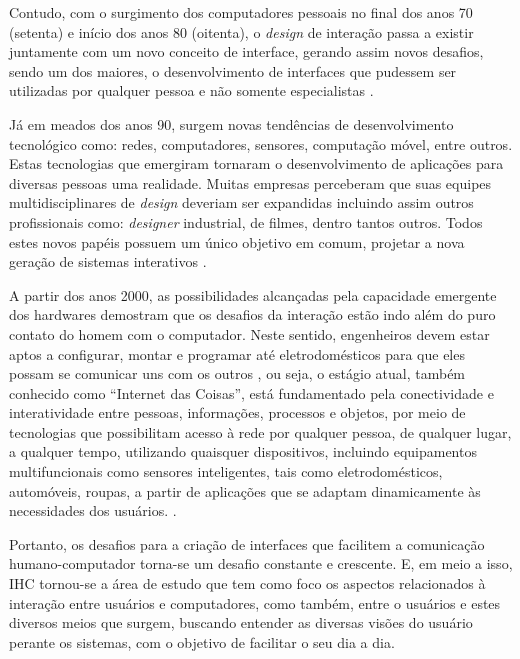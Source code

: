 Contudo, com o surgimento dos computadores pessoais no final dos anos 70 (setenta) e início dos anos 80 (oitenta), o \textit{design} de interação passa a existir juntamente com um novo conceito de interface, gerando assim novos desafios, sendo um dos maiores, o desenvolvimento de interfaces que pudessem ser utilizadas por qualquer pessoa e não somente especialistas \cite{rogers2005design}. 

Já em meados dos anos 90, surgem novas tendências de desenvolvimento tecnológico como: redes, computadores, sensores, computação móvel, entre outros. Estas tecnologias que emergiram tornaram o desenvolvimento de aplicações para diversas pessoas uma realidade. Muitas empresas perceberam que suas equipes multidisciplinares de \textit{design} deveriam ser expandidas incluindo assim outros profissionais como: \textit{designer} industrial, de filmes, dentro tantos outros. Todos estes novos papéis possuem um único objetivo em comum, projetar a nova geração de sistemas interativos \cite{rogers2013design}. 

A partir dos anos 2000, as possibilidades alcançadas pela capacidade emergente dos hardwares demostram que os desafios da interação estão indo além do puro contato do homem com o computador. Neste sentido, engenheiros devem estar aptos a configurar, montar e programar até eletrodomésticos para que eles possam se comunicar uns com os outros \cite{rogers2013design}, ou seja, o estágio atual, também conhecido como ``Internet das Coisas'', está fundamentado pela conectividade e interatividade entre pessoas, informações, processos e objetos, por meio de tecnologias que possibilitam acesso à rede por qualquer pessoa, de qualquer lugar, a qualquer tempo, utilizando quaisquer dispositivos, incluindo equipamentos multifuncionais como sensores inteligentes, tais como eletrodomésticos, automóveis, roupas, a partir de aplicações que se adaptam dinamicamente às necessidades dos usuários. \cite{lacerda2015necessidade}. 

Portanto, os desafios para a criação de interfaces que facilitem a comunicação humano-computador torna-se um desafio constante e crescente. E, em meio a isso, IHC tornou-se a área de estudo que tem como foco os aspectos relacionados à interação entre usuários e computadores, como também, entre o usuários e estes diversos meios que surgem, buscando entender as diversas visões do usuário perante os sistemas, com o objetivo de facilitar o seu dia a dia. 

